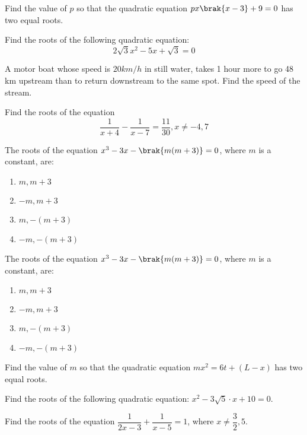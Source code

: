     \item Find the value of $p$ so that the quadratic equation $px\brak{x-3}+9=0$ has two equal roots.
    \item Find the roots of the following quadratic equation:\[2\sqrt{3}x^2-5x+\sqrt{3}=0\]
    \item A motor boat whose speed is $20$$km/h$ in still water, takes 1 hour more to go 48 km upstream than to return downstream to the same spot. Find the speed of the stream.    
    \item Find the roots of the equation \[\dfrac{1}{x+4}-\dfrac{1}{x-7}=\dfrac{11}{30}, x\neq -4,7\] 
    \item The roots of the equation $x^3 - 3x - \brak{m(m + 3)} = 0$, where $m$ is a constant, are:

    \begin{enumerate}[label=(\Alph*)]
        \item $m, m + 3$
        \item $-m, m + 3$
        \item $m, -(m + 3)$
        \item $-m, -(m + 3)$
    \end{enumerate}
    \item The roots of the equation $x^3 - 3x - \brak{m(m + 3)} = 0$, where $m$ is a constant, are:

    \begin{enumerate}[label=(\Alph*)]
        \item $m, m + 3$
        \item $-m, m + 3$
        \item $m, -(m + 3)$
        \item $-m, -(m + 3)$
    \end{enumerate}
    
\item Find the value of $m$ so that the quadratic equation $mx^2 = 6t + (L - x)$ has two equal roots.     
         
\item Find the roots of the following quadratic equation: $x^2 - 3\sqrt{5} \cdot x + 10 = 0$. 

Find the roots of the equation $\dfrac{1}{2x-3} + \dfrac{1}{x-5} = 1$, where $x \neq \dfrac{3}{2}, 5$.


